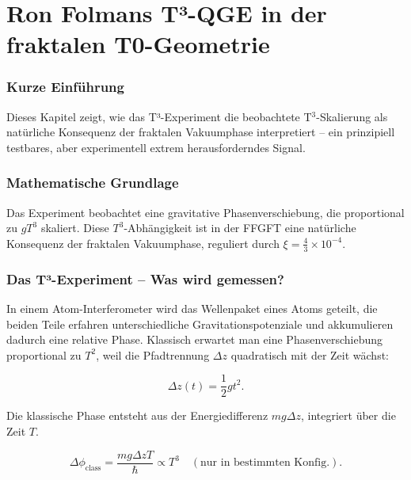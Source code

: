 \chapter{Ron Folmans T³-QGE in der fraktalen T0-Geometrie}


	
	\subsection*{Kurze Einführung}
	
	Dieses Kapitel zeigt, wie das T³-Experiment die beobachtete T$^3$-Skalierung als natürliche Konsequenz der fraktalen Vakuumphase interpretiert -- ein prinzipiell testbares, aber experimentell extrem herausforderndes Signal.
	
	\subsection*{Mathematische Grundlage}
	
	Das Experiment beobachtet eine gravitative Phasenverschiebung, die proportional zu \(g T^3\) skaliert. Diese \(T^3\)-Abhängigkeit ist in der FFGFT eine natürliche Konsequenz der fraktalen Vakuumphase, reguliert durch \(\xi = \frac{4}{3} \times 10^{-4}\).

	

	
	\subsection*{Das T³-Experiment – Was wird gemessen?}
	
	In einem Atom-Interferometer wird das Wellenpaket eines Atoms geteilt, die beiden Teile erfahren unterschiedliche Gravitationspotenziale und akkumulieren dadurch eine relative Phase. Klassisch erwartet man eine Phasenverschiebung proportional zu \(T^2\), weil die Pfadtrennung \(\Delta z\) quadratisch mit der Zeit wächst: 
	
	\begin{equation}
		\Delta z(t) = \frac{1}{2} g t^2.
	\end{equation}
	
	Die klassische Phase entsteht aus der Energiedifferenz \(m g \Delta z\), integriert über die Zeit \(T\).
	
	\begin{equation}
		\Delta \phi_{\text{class}} = \frac{m g \Delta z T}{\hbar} \propto T^3 \quad (\text{nur in bestimmten Konfig.}).
	\end{equation}
	

